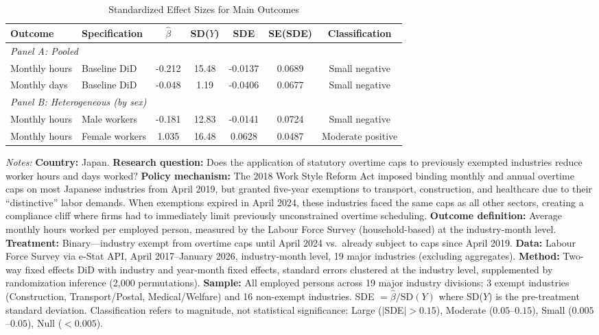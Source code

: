 \begin{table}[H]
\centering
\caption{Standardized Effect Sizes for Main Outcomes}
\label{tab:sde}
\begin{threeparttable}
\begin{adjustbox}{max width=\textwidth}
\begin{tabular}{llccccc}
\toprule
Outcome & Specification & $\hat{\beta}$ & SD($Y$) & SDE & SE(SDE) & Classification \\
\midrule
\multicolumn{7}{l}{\textit{Panel A: Pooled}} \\
Monthly hours & Baseline DiD & -0.212 & 15.48 & -0.0137 & 0.0689 & Small negative \\
Monthly days & Baseline DiD & -0.048 & 1.19 & -0.0406 & 0.0677 & Small negative \\
\midrule
\multicolumn{7}{l}{\textit{Panel B: Heterogeneous (by sex)}} \\
Monthly hours & Male workers & -0.181 & 12.83 & -0.0141 & 0.0724 & Small negative \\
Monthly hours & Female workers & 1.035 & 16.48 & 0.0628 & 0.0487 & Moderate positive \\
\bottomrule
\end{tabular}
\end{adjustbox}
\begin{tablenotes}[flushleft]
\scriptsize\sloppy
\item \textit{Notes:} \textbf{Country:} Japan. \textbf{Research question:} Does the application of statutory overtime caps to previously exempted industries reduce worker hours and days worked? \textbf{Policy mechanism:} The 2018 Work Style Reform Act imposed binding monthly and annual overtime caps on most Japanese industries from April 2019, but granted five-year exemptions to transport, construction, and healthcare due to their ``distinctive'' labor demands. When exemptions expired in April 2024, these industries faced the same caps as all other sectors, creating a compliance cliff where firms had to immediately limit previously unconstrained overtime scheduling. \textbf{Outcome definition:} Average monthly hours worked per employed person, measured by the Labour Force Survey (household-based) at the industry-month level. \textbf{Treatment:} Binary---industry exempt from overtime caps until April 2024 vs.~already subject to caps since April 2019. \textbf{Data:} Labour Force Survey via e-Stat API, April 2017--January 2026, industry-month level, 19 major industries (excluding aggregates). \textbf{Method:} Two-way fixed effects DiD with industry and year-month fixed effects, standard errors clustered at the industry level, supplemented by randomization inference (2,000 permutations). \textbf{Sample:} All employed persons across 19 major industry divisions; 3 exempt industries (Construction, Transport/Postal, Medical/Welfare) and 16 non-exempt industries. SDE $= \hat{\beta} / \text{SD}(Y)$ where SD($Y$) is the pre-treatment standard deviation. Classification refers to magnitude, not statistical significance: Large ($|$SDE$| > 0.15$), Moderate ($0.05$--$0.15$), Small ($0.005$--$0.05$), Null ($< 0.005$).
\end{tablenotes}
\end{threeparttable}
\end{table}

